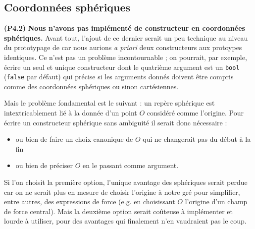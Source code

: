 \documentclass[12pt, letterpaper, twoside]{article}
\newcommand{\T}[1]{\texttt{#1}}
\begin{document}
\subsection{Coordonnées sphériques}
\noindent \textbf{(P4.2)} \textbf{Nous n’avons pas implémenté de constructeur en coordonnées sphériques.} Avant tout, l’ajout de ce dernier serait un peu technique au niveau du prototypage de car nous aurions \textit{a priori} deux constructeurs aux protoypes identiques. Ce n'est pas un problème incontournable ; on pourrait, par exemple, écrire un seul et unique constructeur dont le quatrième argument est un \T{bool} (\T{false} par défaut) qui précise si les arguments donnés doivent être compris comme des coordonnées sphériques ou sinon cartésiennes.

Mais le problème fondamental est le suivant : un repère sphérique est intextricablement lié à la donnée d'un point $O$ considéré comme l'origine. Pour écrire un constructeur sphérique sans ambiguité il serait donc nécessaire :
\begin{itemize}
\item ou bien de faire un choix canonique de $O$ qui ne changerait pas du début à la fin
\item ou bien de préciser $O$ en le passant comme argument.
\end{itemize}
Si l'on choisit la première option, l'unique avantage des sphériques serait perdue car on ne serait plus en mesure de choisir l'origine à notre gré pour simplifier, entre autres, des expressions de force (e.g. en choisissant $O$ l'origine d'un champ de force central). Mais la deuxième option serait coûteuse à implémenter et lourde à utiliser, pour des avantages qui finalement n'en vaudraient pas le coup.
\end{document}
